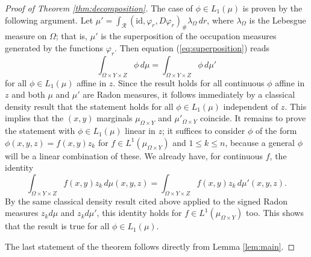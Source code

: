 \documentclass{article}
\theoremstyle{definition}
\theoremstyle{remark}
\begin{document}
\begin{proof}[Proof of Theorem \ref{thm:decomposition}]
 The case of $\phi \in L_1(\mu)$ is proven by the following argument. Let $\mu' = \int_{{\mathcal R}} (\mathrm{id},\varphi_r,D\varphi_r)_{\#}\lambda_{\Omega}\, dr$, where $\lambda_\Omega$ is the Lebesgue measure on $\Omega$; that is, $\mu'$ is the superposition of the occupation measures generated by the functions $\varphi_r$. Then equation (\ref{eq:superposition}) reads
 \[
 \int_{\Omega\times Y\times Z} \phi\,d\mu = \int_{\Omega\times Y\times Z} \phi\,d\mu'
 \]
 for all $\phi\in L_1(\mu)$ affine in $z$. Since the result holds for all continuous $\phi$ affine in $z$ and both $\mu$ and $\mu'$ are Radon measures, it follows immediately by a classical density result that the statement holds for all $\phi \in L_1(\mu)$ independent of $z$. This implies that the $(x,y)$ marginals $\mu_{\Omega\times Y}$ and $\mu'_{\Omega\times Y}$ coincide. 
 It remains to prove the statement with $\phi\in L_1(\mu)$ linear in $z$; it suffices to consider $\phi$ of the form $\phi(x,y,z)=f(x,y)z_k$ for $f\in L^1(\mu_{\Omega\times Y})$ and $1\leq k\leq n$, because a general $\phi$ will be a linear combination of these. We already have, for continuous $f$, the identity
 \[\int_{\Omega\times Y\times Z}f(x,y)z_k\,d\mu(x,y,z)=\int_{\Omega\times Y\times Z}f(x,y)z_k\,d\mu'(x,y,z).\]
 By the same classical density result cited above applied to the signed Radon measures $z_k d\mu$ and $z_k d\mu'$, this identity holds for $f\in L^1(\mu_{\Omega\times Y})$ too. This shows that the result is true for all $\phi\in L_1(\mu)$.
 
%
%
%
%
%
%
%
%
%
 
%
%
%
%
%
%
%
%
%
%
%
%
%
%
%
%
%
%




The last statement of the theorem follows directly from Lemma \ref{lem:main}.
 \end{proof}
 
\end{document}
